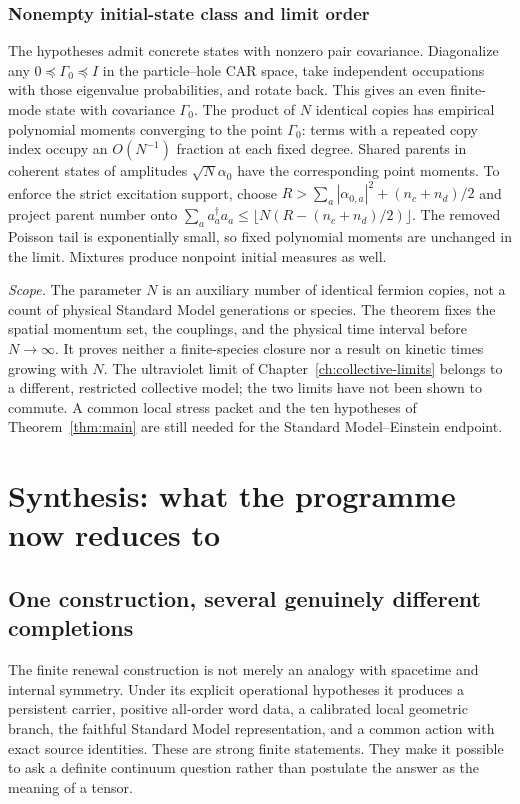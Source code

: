 \documentclass[11pt,a4paper,oneside]{book}
\theoremstyle{plain}
\theoremstyle{definition}
\theoremstyle{remark}
\newcommand{\scope}[1]{\par\smallskip\noindent\textit{Scope.} #1\par\smallskip}
\begin{document}
\subsection{Nonempty initial-state class and limit order}
The hypotheses admit concrete states with nonzero pair covariance.
Diagonalize any $0\preceq\Gamma_0\preceq I$ in the particle--hole CAR
space, take independent occupations with those eigenvalue probabilities,
and rotate back.  This gives an even finite-mode state with covariance
$\Gamma_0$.  The product of $N$ identical copies has empirical polynomial
moments converging to the point $\Gamma_0$: terms with a repeated copy
index occupy an $O(N^{-1})$ fraction at each fixed degree.  Shared
parents in coherent states of amplitudes $\sqrt N\alpha_0$ have the
corresponding point moments.  To enforce the strict excitation support,
choose $R>\sum_a|\alpha_{0,a}|^2+(n_c+n_d)/2$ and project parent number
onto
$\sum_a a_a^\dagger a_a\le\lfloor N(R-(n_c+n_d)/2)\rfloor$.
The removed Poisson tail is exponentially small, so fixed polynomial
moments are unchanged in the limit.  Mixtures produce nonpoint initial
measures as well.

\scope{The parameter $N$ is an auxiliary number of identical fermion
copies, not a count of physical Standard Model generations or species.
The theorem fixes the spatial momentum set, the couplings, and the
physical time interval before $N\to\infty$.  It proves neither a
finite-species closure nor a result on kinetic times growing with $N$.
The ultraviolet limit of Chapter~\ref{ch:collective-limits} belongs to
a different, restricted collective model; the two limits have not been
shown to commute.  A common local stress packet and the ten hypotheses
of Theorem~\ref{thm:main} are still needed for the
Standard Model--Einstein endpoint.}


\chapter{Synthesis: what the programme now reduces to}
\label{ch:outlook}
\section{One construction, several genuinely different completions}
The finite renewal construction is not merely an analogy with spacetime and internal symmetry. Under its explicit operational hypotheses it produces a persistent carrier, positive all-order word data, a calibrated local geometric branch, the faithful Standard Model representation, and a common action with exact source identities. These are strong finite statements. They make it possible to ask a definite continuum question rather than postulate the answer as the meaning of a tensor.
\end{document}
